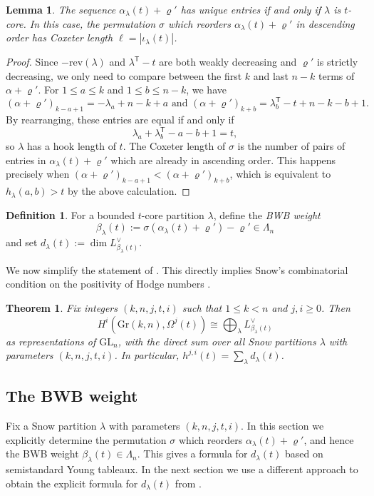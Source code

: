 \documentclass{amsart}
\newcommand\T{\mathsf{T}}
\newcommand\Gr{\mathrm{Gr}}
\newcommand\GL{\mathrm{GL}}
\theoremstyle{plain}
\newtheorem{theorem}{Theorem}[section]
\newtheorem{lemma}[lemma]{Lemma}
\theoremstyle{definition}
\newtheorem{definition}[definition]{Definition}
\numberwithin{equation}{section}
\begin{document}
\begin{lemma}\label{lem:unique-entries}
The sequence $\alpha_\lambda(t)+\varrho'$ has unique entries if and only if $\lambda$ is $t$-core. In this case, the permutation $\sigma$ which reorders $\alpha_\lambda(t)+\varrho'$ in descending order has Coxeter length $\ell=|\iota_\lambda(t)|$.
\end{lemma}
\begin{proof}
Since $-\mathrm{rev}(\lambda)$ and $\lambda^\T-t$ are both weakly decreasing and $\varrho'$ is strictly decreasing, we only need to compare between the first $k$ and last $n-k$ terms of $\alpha+\varrho'$. For $1\leq a\leq k$ and $1\leq b\leq n-k$, we have
\[(\alpha+\varrho')_{k-a+1}=-\lambda_a+n-k+a\text{ and }(\alpha+\varrho')_{k+b}=\lambda_b^\T-t+n-k-b+1.\]
By rearranging, these entries are equal if and only if
\[\lambda_a+\lambda_b^\T-a-b+1=t,\]
so $\lambda$ has a hook length of $t$. The Coxeter length of $\sigma$ is the number of pairs of entries in $\alpha_\lambda(t)+\varrho'$ which are already in ascending order. This happens precisely when $(\alpha+\varrho')_{k-a+1}<(\alpha+\varrho')_{k+b}$, which is equivalent to $h_{\lambda}(a,b)>t$ by the above calculation.
\end{proof}

\begin{definition}\label{def:beta}
For a bounded $t$-core partition $\lambda$, define the \emph{BWB weight}
\[\beta_\lambda(t):=\sigma(\alpha_\lambda(t)+\varrho')-\varrho'\in\Lambda_n\]
and set $d_\lambda(t):=\dim L_{\beta_\lambda(t)}^\vee$. 
\end{definition}
We now simplify the statement of . This directly implies Snow's combinatorial condition on the positivity of Hodge numbers \cite[\S3.1]{Sno86}.

\begin{theorem}\label{thm:cohomology-iso}
Fix integers $(k,n,j,t,i)$ such that $1\leq k< n$ and $j,i\geq 0$. Then
\[H^i(\Gr(k,n),\Omega^j(t))\cong\bigoplus_\lambda L_{\beta_\lambda(t)}^\vee\]
as representations of $\GL_n$, with the direct sum over all Snow partitions $\lambda$ with parameters $(k,n,j,t,i)$. In particular, $h^{j,i}(t)=\sum_\lambda d_\lambda(t)$.
\end{theorem}

\subsection{The BWB weight}

Fix a Snow partition $\lambda$ with parameters $(k,n,j,t,i)$. In this section we explicitly determine the permutation $\sigma$ which reorders $\alpha_\lambda(t)+\varrho'$, and hence the BWB weight $\beta_\lambda(t)\in\Lambda_n$. This gives a formula for $d_\lambda(t)$ based on semistandard Young tableaux. In the next section we use a different approach to obtain the explicit formula for $d_\lambda(t)$ from .
\end{document}
